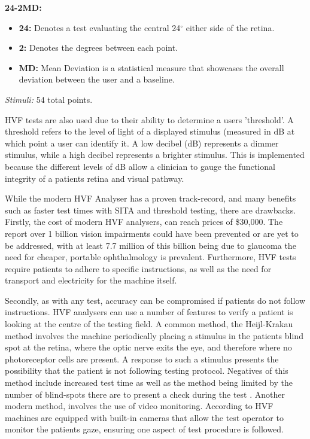 \documentclass{l4proj}
\begin{document}
\noindent \textbf{24-2MD:}
\begin{itemize}
    \item \textbf{24:} Denotes a test evaluating the central 24$^\circ$ either side of the retina.
    \item \textbf{2:} Denotes the degrees between each point.
    \item \textbf{MD:} Mean Deviation is a statistical measure that showcases the overall deviation between the user and a baseline.
\end{itemize}
\textit{Stimuli:} 54 total points.
\newline

HVF tests are also used due to their ability to determine a users 'threshold'. A threshold refers to the level of light of a displayed stimulus (measured in dB at which point a user can identify it. A low decibel (dB) represents a dimmer stimulus, while a high decibel represents a brighter stimulus. This is implemented because the different levels of dB allow a clinician to gauge the functional integrity of a patients retina and visual pathway.

While the modern HVF Analyser has a proven track-record, and many benefits such as faster test times with SITA and threshold testing, there are drawbacks. Firstly, the cost of modern HVF analysers, can reach prices of \$30,000. The \citet{WHO2023Blindness} report over 1 billion vision impairments could have been prevented or are yet to be addressed, with at least 7.7 million of this billion being due to glaucoma the need for cheaper, portable ophthalmology is prevalent. Furthermore, HVF tests require patients to adhere to specific instructions, as well as the need for transport and electricity for the machine itself.

Secondly, as with any test, accuracy can be compromised if patients do not follow instructions. HVF analysers can use a number of features to verify a patient is looking at the centre of the testing field. A common method, the Heijl-Krakau method involves the machine periodically placing a stimulus in the patients blind spot at the retina, where the optic nerve exits the eye, and therefore where no photoreceptor cells are present. A response to such a stimulus presents the possibility that the patient is not following testing protocol. Negatives of this method include increased test time \citet{Marzban2008HeijlKrakau} as well as the method being limited by the number of blind-spots there are to present a check during the test \citet{Heijl2021PerimetryPrimer}. Another modern method, involves the use of video monitoring. According to \citet{RuiaTripathy2021HVF} HVF machines are equipped with built-in cameras that allow the test operator to monitor the patients gaze, ensuring one aspect of test procedure is followed.
\end{document}
